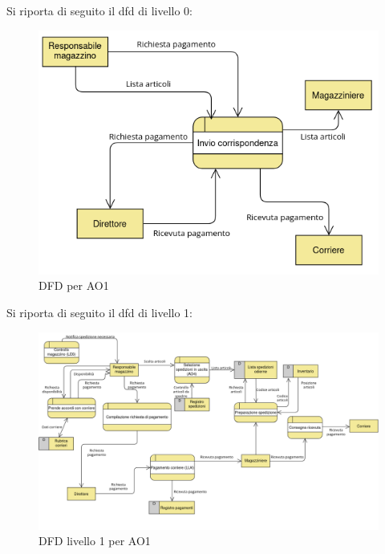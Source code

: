 \documentclass[a4paper,12pt]{article}
\begin{document}
Si riporta di seguito il dfd di livello 0:
\begin{figure}[H]
  \centering
  \includegraphics[width=0.8\linewidth]{assets/dfd_0_AO1.png}
  \caption{DFD per AO1}
\end{figure}
Si riporta di seguito il dfd di livello 1:
\begin{figure}[H]
  \centering
  \includegraphics[width=0.8\linewidth]{assets/dfd_1_AO1.png}
  \caption{DFD livello 1 per AO1}
\end{figure}
\end{document}

